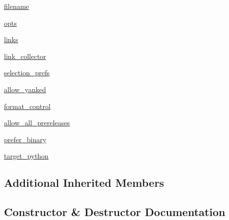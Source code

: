 \begin{DoxyCompactItemize}
\item 
\hyperlink{classpip_1_1__internal_1_1cli_1_1req__command_1_1RequirementCommand_a7c15e110be3b4bf4d95c38f76bf30ab9}{filename}
\item 
\hyperlink{classpip_1_1__internal_1_1cli_1_1req__command_1_1RequirementCommand_a5b60d343da29dcc8442518c6a0c1a2f6}{opts}
\item 
\hyperlink{classpip_1_1__internal_1_1cli_1_1req__command_1_1RequirementCommand_a7f23869370a464f27bbc3150383d86d0}{links}
\item 
\hyperlink{classpip_1_1__internal_1_1cli_1_1req__command_1_1RequirementCommand_a3a79c6fdb62e8e24bb535c139415d9c0}{link\+\_\+collector}
\item 
\hyperlink{classpip_1_1__internal_1_1cli_1_1req__command_1_1RequirementCommand_a550bf696fd48b5f43f7b7bb09c41a02e}{selection\+\_\+prefs}
\item 
\hyperlink{classpip_1_1__internal_1_1cli_1_1req__command_1_1RequirementCommand_afe7a48faaf2dd4d68a9b263ae85018c5}{allow\+\_\+yanked}
\item 
\hyperlink{classpip_1_1__internal_1_1cli_1_1req__command_1_1RequirementCommand_a7b63f01649f21fd6a9e039fc7cb167cc}{format\+\_\+control}
\item 
\hyperlink{classpip_1_1__internal_1_1cli_1_1req__command_1_1RequirementCommand_abc2a4882eb1f88c027b986f74b248bb3}{allow\+\_\+all\+\_\+prereleases}
\item 
\hyperlink{classpip_1_1__internal_1_1cli_1_1req__command_1_1RequirementCommand_a510be0d4dda6e1779ceb700a6b4f234b}{prefer\+\_\+binary}
\item 
\hyperlink{classpip_1_1__internal_1_1cli_1_1req__command_1_1RequirementCommand_a704a9da2e3d638c796fb35c8d89f557c}{target\+\_\+python}
\end{DoxyCompactItemize}
\subsection*{Additional Inherited Members}


\subsection{Constructor \& Destructor Documentation}
\mbox{\label{classpip_1_1__internal_1_1cli_1_1req__command_1_1RequirementCommand_aca41a8020126e2b743848fbe365ccf2d}} 
